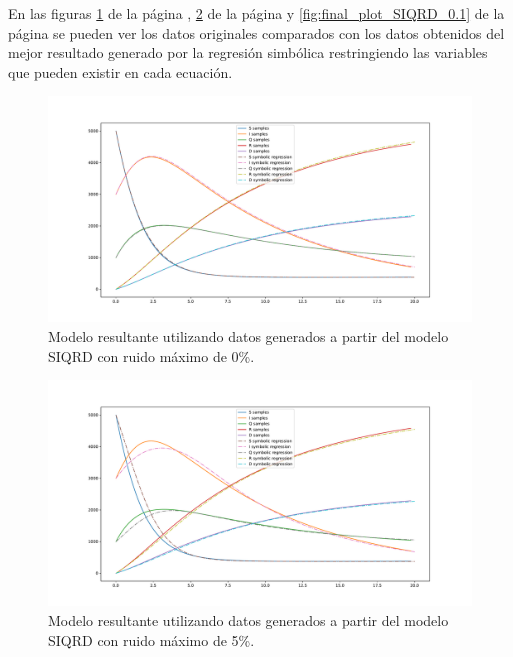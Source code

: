 En las figuras \ref{fig:final_plot_SIQRD_0.0} de la página \pageref{fig:final_plot_SIQRD_0.0}, \ref{fig:final_plot_SIQRD_0.05} de la página \pageref{fig:final_plot_SIQRD_0.05} y \ref{fig:final_plot_SIQRD_0.1} de la página \pageref{fig:final_plot_SIQRD_0.1} se pueden ver los datos originales comparados con los datos obtenidos del mejor resultado generado por la regresión simbólica restringiendo las variables que pueden existir en cada ecuación.

\begin{figure}[h]
    \centering
    \includegraphics[width=\textwidth]{"figures/final_plot_SIQRD_0.0.pdf"}
    \caption{Modelo resultante utilizando datos generados a partir del modelo SIQRD con ruido máximo de 0\%.}
    \label{fig:final_plot_SIQRD_0.0}
\end{figure}

\begin{figure}[h]
    \centering
    \includegraphics[width=\textwidth]{"figures/final_plot_SIQRD_0.05.pdf"}
    \caption{Modelo resultante utilizando datos generados a partir del modelo SIQRD con ruido máximo de 5\%.}
    \label{fig:final_plot_SIQRD_0.05}
\end{figure}

